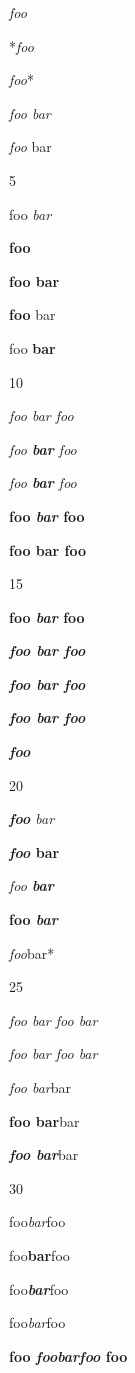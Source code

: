 
\def\mytitle{Emph and Strong Star}


\emph{foo}

*\emph{foo}

\emph{foo}*

\emph{foo bar}

\emph{foo} bar

5

foo \emph{bar}

\textbf{foo}

\textbf{foo bar}

\textbf{foo} bar

foo \textbf{bar}

10

\emph{foo \emph{bar} foo}

\emph{foo \textbf{bar} foo}

\emph{foo \textbf{\emph{bar}} foo}

\textbf{foo \emph{bar} foo}

\textbf{foo \textbf{bar} foo}

15

\textbf{foo \textbf{\emph{bar}} foo}

\textbf{\emph{foo \emph{bar} foo}}

\textbf{\emph{foo \textbf{bar} foo}}

\textbf{\emph{foo \textbf{\emph{bar}} foo}}

\textbf{\emph{foo}}

20

\emph{\textbf{foo} bar}

\textbf{\emph{foo} bar}

\emph{foo \textbf{bar}}

\textbf{foo \emph{bar}}

\emph{foo}bar*

25

\emph{foo \emph{bar \emph{foo \emph{bar}}}}

\emph{\emph{\emph{\emph{foo} bar} foo} bar}

\emph{foo bar}bar

\textbf{foo bar}bar

\textbf{\emph{foo bar}}bar

30

foo\emph{bar}foo

foo\textbf{bar}foo

foo\textbf{\emph{bar}}foo

foo\emph{bar}foo

\textbf{foo \emph{foobarfoo} foo}

